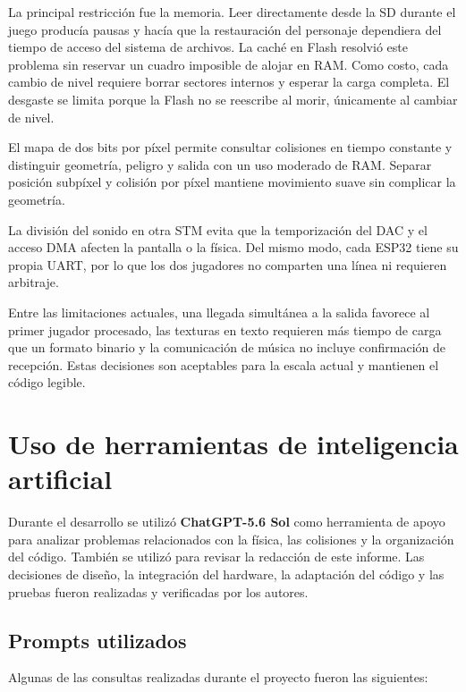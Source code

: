\documentclass[11pt,letterpaper]{article}
\begin{document}
La principal restricción fue la memoria. Leer directamente desde la SD durante el
juego producía pausas y hacía que la restauración del personaje dependiera del tiempo
de acceso del sistema de archivos. La caché en Flash resolvió este problema sin
reservar un cuadro imposible de alojar en RAM. Como costo, cada cambio de nivel
requiere borrar sectores internos y esperar la carga completa. El desgaste se limita
porque la Flash no se reescribe al morir, únicamente al cambiar de nivel.

El mapa de dos bits por píxel permite consultar colisiones en tiempo constante y
distinguir geometría, peligro y salida con un uso moderado de RAM. Separar posición
subpíxel y colisión por píxel mantiene movimiento suave sin complicar la geometría.

La división del sonido en otra STM evita que la temporización del DAC y el acceso DMA
afecten la pantalla o la física. Del mismo modo, cada ESP32 tiene su propia UART, por
lo que los dos jugadores no comparten una línea ni requieren arbitraje.

Entre las limitaciones actuales, una llegada simultánea a la salida favorece al
primer jugador procesado, las texturas en texto requieren más tiempo de carga que un
formato binario y la comunicación de música no incluye confirmación de recepción.
Estas decisiones son aceptables para la escala actual y mantienen el código legible.

\section{Uso de herramientas de inteligencia artificial}

Durante el desarrollo se utilizó \textbf{ChatGPT-5.6 Sol} como herramienta de apoyo
para analizar problemas relacionados con la física, las colisiones y la organización
del código. También se utilizó para revisar la redacción de este informe. Las
decisiones de diseño, la integración del hardware, la adaptación del código y las
pruebas fueron realizadas y verificadas por los autores.

\subsection{Prompts utilizados}

Algunas de las consultas realizadas durante el proyecto fueron las siguientes:
\end{document}
